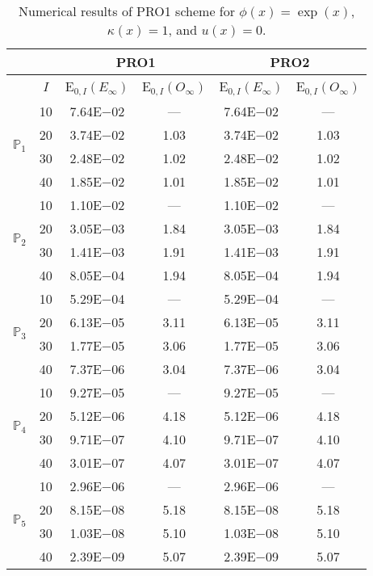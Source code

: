 \begin{table}[H]
\caption{Numerical results of PRO1 scheme for $\phi(x)=\exp(x)$, $\kappa(x)=1$, and $u(x)=0$.}
\setlength{\tabcolsep}{5pt}
\centering
\begin{tabular}{@{}l c c c c c@{}}
\toprule
 &  & \multicolumn{2}{c}{PRO1} & \multicolumn{2}{c}{PRO2}\\
\midrule
 & $I$ & E$_{0,I}(E_{\infty})$ & E$_{0,I}(O_{\infty})$ & E$_{0,I}(E_{\infty})$ & E$_{0,I}(O_{\infty})$\\
\midrule
\multirow{4}{*}{$\mathbb{P}_{1}$}
 & 10 & 7.64E$-$02 & --- & 7.64E$-$02 & ---\\
 & 20 & 3.74E$-$02 & 1.03 & 3.74E$-$02 & 1.03 \\
 & 30 & 2.48E$-$02 & 1.02 & 2.48E$-$02 & 1.02 \\
 & 40 & 1.85E$-$02 & 1.01 & 1.85E$-$02 & 1.01 \\
\midrule
\multirow{4}{*}{$\mathbb{P}_{2}$}
 & 10 & 1.10E$-$02 & --- & 1.10E$-$02 & ---\\
 & 20 & 3.05E$-$03 & 1.84 & 3.05E$-$03 & 1.84 \\
 & 30 & 1.41E$-$03 & 1.91 & 1.41E$-$03 & 1.91 \\
 & 40 & 8.05E$-$04 & 1.94 & 8.05E$-$04 & 1.94 \\
\midrule
\multirow{4}{*}{$\mathbb{P}_{3}$}
 & 10 & 5.29E$-$04 & --- & 5.29E$-$04 & ---\\
 & 20 & 6.13E$-$05 & 3.11 & 6.13E$-$05 & 3.11 \\
 & 30 & 1.77E$-$05 & 3.06 & 1.77E$-$05 & 3.06 \\
 & 40 & 7.37E$-$06 & 3.04 & 7.37E$-$06 & 3.04 \\
\midrule
\multirow{4}{*}{$\mathbb{P}_{4}$}
 & 10 & 9.27E$-$05 & --- & 9.27E$-$05 & ---\\
 & 20 & 5.12E$-$06 & 4.18 & 5.12E$-$06 & 4.18 \\
 & 30 & 9.71E$-$07 & 4.10 & 9.71E$-$07 & 4.10 \\
 & 40 & 3.01E$-$07 & 4.07 & 3.01E$-$07 & 4.07 \\
\midrule
\multirow{4}{*}{$\mathbb{P}_{5}$}
 & 10 & 2.96E$-$06 & --- & 2.96E$-$06 & ---\\
 & 20 & 8.15E$-$08 & 5.18 & 8.15E$-$08 & 5.18 \\
 & 30 & 1.03E$-$08 & 5.10 & 1.03E$-$08 & 5.10 \\
 & 40 & 2.39E$-$09 & 5.07 & 2.39E$-$09 & 5.07 \\
\bottomrule
\end{tabular}
\label{Table:PRO:Test1}
\end{table}
